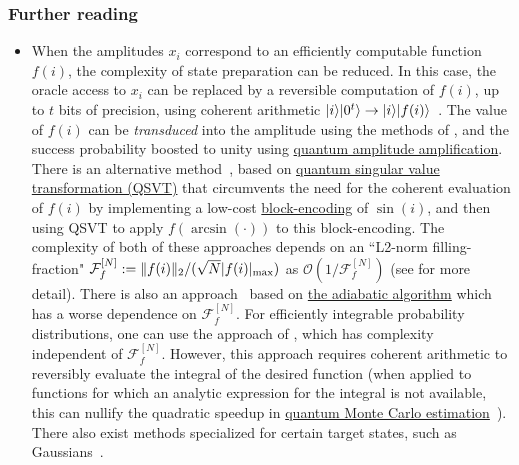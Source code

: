 \begin{refsection}
\subsubsection*{Further reading}\label{StatePrepData-further-reading}
\begin{itemize}
    \item  When the amplitudes $x_i$ correspond to an efficiently computable function $f(i)$, the complexity of state preparation can be reduced. In this case, the oracle access to $x_i$ can be replaced by a reversible computation of $f(i)$, up to $t$ bits of precision, using coherent arithmetic $\lvert i\rangle\lvert0^t\rangle \rightarrow \lvert i\rangle\lvert f(i)\rangle$~\cite{haner2018OptimizingQuantumArithmetic,bhaskar2015ReversibleArithmetic,munoz2018SquareRoot}. The value of $f(i)$ can be \textit{transduced} into the amplitude using the methods of \cite{grover2000SynthesisOfSuperpositions,sanders2019BlackBoxQuantumStatePreparation,wang2021BlackBoxLCU, bausch2020BlackBoxState}, and the success probability boosted to unity using \hyperref[prim:AmpAmp]{quantum amplitude amplification}. There is an alternative method~\cite{mcardle2022StatePreparation}, based on \hyperref[prim:QSVT]{quantum singular value transformation (QSVT)} that circumvents the need for the coherent evaluation of $f(i)$ by implementing a low-cost \hyperref[prim:BlockEncodings]{block-encoding} of $\sin(i)$, and then using QSVT to apply $f(\arcsin(\cdot))$ to this block-encoding. The complexity of both of these approaches depends on an ``L2-norm filling-fraction" $\mathcal{F}_f^{[N]} := \lVert f(i)\rVert_2 / (\sqrt{N} |f(i)|_{\mathrm{max}})$ as $\mathcal{O}(1/\mathcal{F}_f^{[N]})$ (see \cite{mcardle2022StatePreparation} for more detail). There is also an approach~\cite{rattew2022AdiabaticStatePrep} based on \hyperref[prim:QuantumAdiabaticAlgorithm]{the adiabatic algorithm} which has a worse dependence on $\mathcal{F}_f^{[N]}$. For efficiently integrable probability distributions, one can use the approach of \cite{grover2002SuperposEffIntegrProbDistr}, which has complexity independent of $\mathcal{F}_f^{[N]}$. However, this approach requires coherent arithmetic to reversibly evaluate the integral of the desired function (when applied to functions for which an analytic expression for the integral is not available, this can nullify the quadratic speedup in \hyperref[prim:AmpEst]{quantum Monte Carlo estimation}~\cite{herbert2021GroverRudolphNoSpeedup}). There also exist methods specialized for certain target states, such as Gaussians~\cite{kitaev2008WavefunctionPreparing,rattew2021GaussianStatePrep}.


\end{itemize}
\end{refsection}
